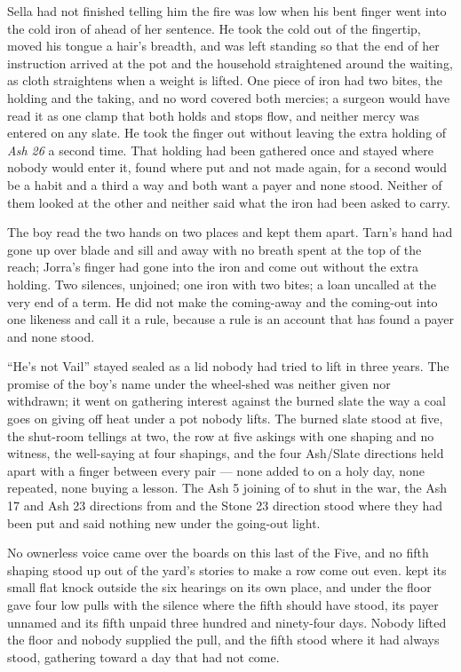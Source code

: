 Sella had not finished telling him the fire was low when his bent finger went into the cold iron of  ahead of her sentence. He took the cold out of the fingertip, moved his tongue a hair's breadth, and was left standing so that the end of her instruction arrived at the pot and the household straightened around the waiting, as cloth straightens when a weight is lifted. One piece of iron had two bites, the holding and the taking, and no  word covered both mercies; a surgeon would have read it as one clamp that both holds and stops flow, and neither mercy was entered on any slate. He took the finger out without leaving the extra holding of \emph{Ash 26} a second time. That holding had been gathered once and stayed where nobody would enter it, found where put and not made again, for a second would be a habit and a third a way and both want a payer and none stood. Neither of them looked at the other and neither said what the iron had been asked to carry.

The boy read the two hands on two places and kept them apart. Tarn's hand had gone up over blade and sill and away with no breath spent at the top of the reach; Jorra's finger had gone into the iron and come out without the extra holding. Two silences, unjoined; one iron with two bites; a loan uncalled at the very end of a term. He did not make the coming-away and the coming-out into one likeness and call it a rule, because a rule is an account that has found a payer and none stood.

\scenebreak

“He's not Vail” stayed sealed as a lid nobody had tried to lift in three years. The promise of the boy's name under the wheel-shed was neither given nor withdrawn; it went on gathering interest against the burned slate the way a coal goes on giving off heat under a pot nobody lifts. The burned slate stood at five, the shut-room tellings at two, the row at five askings with one shaping and no witness, the well-saying at four shapings, and the four Ash/Slate directions held apart with a finger between every pair --- none added to on a holy day, none repeated, none buying a lesson. The Ash 5 joining of  to  shut in the war, the Ash 17 and Ash 23 directions from  and the Stone 23 direction stood where they had been put and said nothing new under the going-out light.

No ownerless voice came over the boards on this last of the Five, and no fifth shaping stood up out of the yard's stories to make a row come out even.  kept its small flat knock outside the six hearings on its own place, and  under the floor gave four low pulls with the silence where the fifth should have stood, its payer unnamed and its fifth unpaid three hundred and ninety-four days. Nobody lifted the floor and nobody supplied the pull, and the fifth stood where it had always stood, gathering toward a day that had not come.

